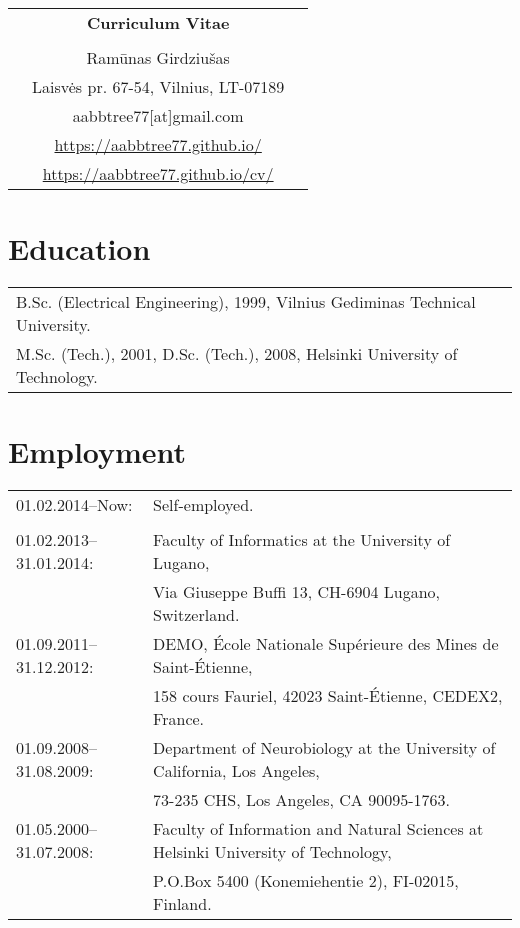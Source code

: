 \documentclass[a4paper,11pt]{article}
\begin{document}

%
%
\begin{center}
\begin{tabular}{ccc}
&\Large \textbf{Curriculum Vitae}&\\
\\
& Ram\={u}nas Girdziu\v{s}as &\\  
& Laisvės pr. 67-54, Vilnius, LT-07189 &\\
& aabbtree77[at]gmail.com &\\
& \url{https://aabbtree77.github.io/} &\\
& \url{https://aabbtree77.github.io/cv/}
\end{tabular}
\end{center}
%
\section{Education}
%
\begin{tabular}{ll}
        B.Sc. (Electrical Engineering), 1999, Vilnius Gediminas Technical University.\\
        M.Sc. (Tech.), 2001, D.Sc. (Tech.), 2008, Helsinki University of Technology.
\end{tabular}
%
\section{Employment}
%
\begin{tabular}{ll}
01.02.2014--Now:        & Self-employed. \\
                        & \\
01.02.2013--31.01.2014: & Faculty of Informatics at the University of Lugano,\\
                        & Via Giuseppe Buffi 13, CH-6904 Lugano, Switzerland. 
\\
01.09.2011--31.12.2012: & DEMO, \'{E}cole Nationale Sup\'{e}rieure des Mines de Saint-\'{E}tienne,\\
&158 cours Fauriel, 42023 Saint-\'Etienne, CEDEX2, France.
\\
01.09.2008--31.08.2009: & Department of Neurobiology at the University of California, Los Angeles,\\
&73-235 CHS, Los Angeles, CA 90095-1763.
\\
01.05.2000--31.07.2008: & Faculty of Information and Natural Sciences at Helsinki University of Technology,\\ 
&  P.O.Box 5400 (Konemiehentie 2), FI-02015, Finland.
\end{tabular}
\end{document}
